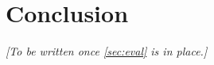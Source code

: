 \section{Conclusion}\label{sec:concl}

\emph{[To be written once \cref{sec:eval} is in place.]}

%
%
%
%
%
